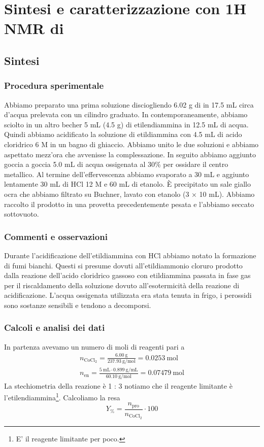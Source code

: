 \section{Sintesi e caratterizzazione con 1H NMR di }
\subsection{Sintesi }
\subsubsection{Procedura sperimentale}
Abbiamo preparato una prima soluzione disciogliendo 6.02 g di  in 17.5 mL circa d’acqua prelevata con un cilindro graduato. In contemporaneamente, abbiamo sciolto in un altro becher 5 mL (4.5 g) di etilendiammina in 12.5 mL di acqua. Quindi abbiamo acidificato la soluzione di etildiammina con 4.5 mL di acido cloridrico 6 M in un bagno di ghiaccio. Abbiamo unito le due soluzioni e abbiamo aspettato mezz’ora che avvenisse la complessazione. In seguito abbiamo aggiunto goccia a goccia 5.0 mL di acqua ossigenata al 30\% per ossidare il centro metallico. Al termine dell’effervescenza abbiamo svaporato a 30 mL e aggiunto lentamente 30 mL di HCl 12 M e 60 mL di etanolo. È precipitato un sale giallo ocra che abbiamo filtrato su Buchner, lavato con etanolo (3 × 10 mL). Abbiamo raccolto il prodotto in una provetta precedentemente pesata e l'abbiamo seccato sottovuoto.

\subsubsection{Commenti e osservazioni}
Durante l'acidificazione dell'etildiammina con HCl abbiamo notato la formazione di fumi bianchi. Questi si presume dovuti all'etildiammonio cloruro prodotto dalla reazione dell'acido cloridrico gassoso con etildiammina passata in fase gas per il riscaldamento della soluzione dovuto all'esotermicità della reazione di acidificazione. L'acqua ossigenata utilizzata era stata tenuta in frigo, i perossidi sono sostanze sensibili e tendono a decomporsi.


\subsubsection{Calcoli e analisi dei dati}
In partenza avevamo un numero di moli di reagenti pari a
$$
\begin{gathered}
n_{\mathrm{CoCl}_2}=\frac{6.00 \mathrm{~g}}{237.93 \mathrm{~g} / \mathrm{mol}}=0.0253 \mathrm{~mol} \\
n_{\mathrm{en}}=\frac{5 \mathrm{~mL} \cdot 0.899 \mathrm{~g} / \mathrm{mL}}{60.10 \mathrm{~g} / \mathrm{mol}}=0.07479 \mathrm{~mol}
\end{gathered}
$$
La stechiometria della reazione è 1 : 3 notiamo che il reagente limitante è l'etilendiammina\footnote{E' il reagente limitante per poco. }.
Calcoliamo la resa 
\[ Y_\% = \frac{n_\text{pro}}{n_{\mathrm{CoCl}_2}}\cdot 100 \]

